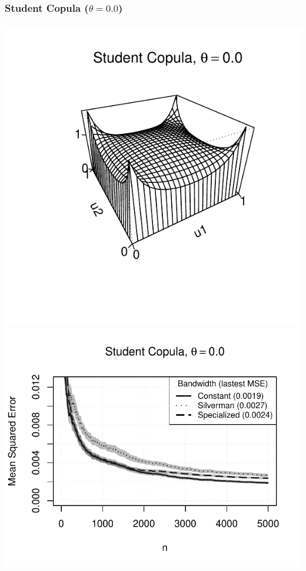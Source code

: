 \documentclass[aspectratio=169]{beamer}
\begin{document}
		\subsubsection{Student Copula ($ \theta = 0.0 $)}\label{numResults}
			\begin{frame}
				\frametitle{\insertsubsubsection}
				
				\begin{flushleft}
					\includegraphics[width=0.4\linewidth]{plots/numerical_results/student0}
					\includegraphics[width=0.5\linewidth]{../text/plots/experiment_results/student0}
				\end{flushleft}
				
			\end{frame}			
		
\end{document}

